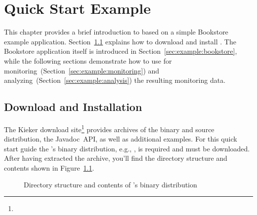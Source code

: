 % 


\chapter{Quick Start Example}\label{chap:example}

This chapter provides a brief introduction to \Kieker{} based on a simple %
Bookstore example application. Section~\ref{sec:example:downloadInstall} %
explains how to download and install \Kieker{}. The Bookstore application itself %
is introduced in Section~\ref{sec:example:bookstore}, while the following %
sections demonstrate %
how to use \Kieker{} for monitoring~(Section~\ref{sec:example:monitoring}) and %
analyzing~(Section~\ref{sec:example:analysis}) the resulting monitoring data. %

\section{Download and Installation}\label{sec:example:downloadInstall}

The Kieker download site\footnote{\KiekerDownloadURL{}} provides archives %
of the binary and source distribution, the Javadoc~API, as well %
as additional examples. %
For this quick start guide the \Kieker{}'s binary distribution, e.g., %
\file{\binaryFileForDownload}, is required and must be downloaded. %
After having extracted the archive, you'll find the directory structure and %
contents shown in Figure~\ref{fig:binary-layout}.

\begin{figure}%
\begin{graybox}
\end{graybox}
\caption{Directory structure and contents of \Kieker{}'s binary distribution}
\label{fig:binary-layout}
\end{figure}


